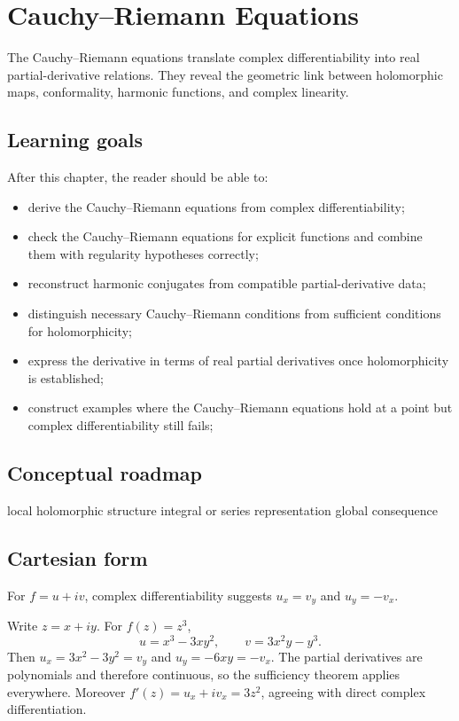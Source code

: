 \chapter{Cauchy–Riemann Equations}
\label{ch:iv02}

The Cauchy–Riemann equations translate complex differentiability into real partial-derivative relations. They reveal the geometric link between holomorphic maps, conformality, harmonic functions, and complex linearity.

\section*{Learning goals}
After this chapter, the reader should be able to:
\begin{itemize}
\item derive the Cauchy--Riemann equations from complex differentiability;
\item check the Cauchy--Riemann equations for explicit functions and combine them with regularity hypotheses correctly;
\item reconstruct harmonic conjugates from compatible partial-derivative data;
\item distinguish necessary Cauchy--Riemann conditions from sufficient conditions for holomorphicity;
\item express the derivative in terms of real partial derivatives once holomorphicity is established;
\item construct examples where the Cauchy--Riemann equations hold at a point but complex differentiability still fails;
\end{itemize}
\section*{Conceptual roadmap}
\volroadmap
  {local holomorphic structure}
  {integral or series representation}
  {global consequence}

\section{Cartesian form}
For $f=u+iv$, complex differentiability suggests $u_x=v_y$ and $u_y=-v_x$.

\begin{example}\label{ex:iv02-expand-01}
Write \(z=x+iy\). For \(f(z)=z^3\),
\[
u=x^3-3xy^2,\qquad v=3x^2y-y^3.
\]
Then \(u_x=3x^2-3y^2=v_y\) and \(u_y=-6xy=-v_x\). The partial derivatives are polynomials and therefore continuous, so the sufficiency theorem applies everywhere. Moreover \(f'(z)=u_x+iv_x=3z^2\), agreeing with direct complex differentiation.
\end{example}
